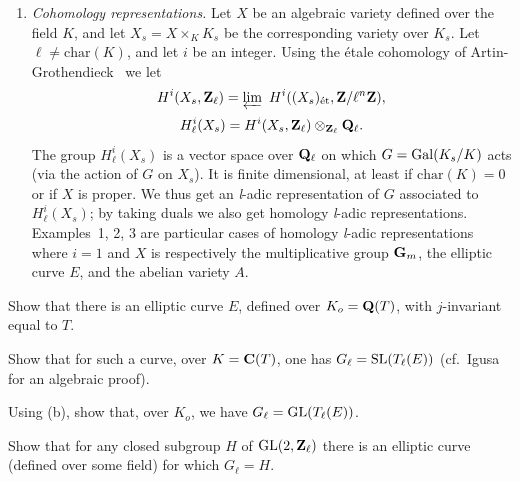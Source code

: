 \begin{enumerate}[label=\arabic*.,leftmargin=2.2em,itemsep=0.15ex,topsep=0.4ex]
\item \emph{Cohomology representations.}  Let $X$ be an algebraic
variety defined over the field $K$, and let $X_s = X \times_K K_s$ be
the corresponding variety over $K_s$.  Let $\ell \neq
\mathrm{char}(K)$, and let $i$ be an integer.  Using the étale
cohomology of Artin-Grothendieck~\cite{artin-grothendieck-sga} we let
\[
H^i(X_s, \Z_\ell) = \varprojlim\ H^i((X_s)_{\text{ét}}, \Z/\ell^n\Z),
\]
\[
H^i_\ell(X_s) = H^i(X_s, \mathbf{Z}_\ell) \mathbin{\otimes}_{\mathbf{Z}_\ell} \mathbf{Q}_\ell.
\]
The group $H^i_\ell(X_s)$ is a vector space over $\mathbf{Q}_\ell$ on which
$G = \mathrm{Gal}(K_s/K)$ acts (via the action of $G$ on $X_s$).  It is finite
dimensional, at least if $\mathrm{char}(K) = 0$ or if $X$ is proper.  We
thus get an \textit{l}-adic representation of $G$ associated to
$H^i_\ell(X_s)$; by taking duals we also get homology \textit{l}-adic
representations.  Examples~1, 2, 3 are particular cases of homology
\textit{l}-adic representations where $i = 1$ and $X$ is respectively
the multiplicative group $\mathbf{G}_m$, the elliptic curve $E$, and the abelian
variety $A$.
\end{enumerate}

\begin{alist}
\item Show that there is an elliptic curve $E$, defined over
$K_o = \mathbf{Q}(T)$, with $j$-invariant equal to $T$.
\item Show that for such a curve, over $K = \mathbf{C}(T)$, one has
$G_\ell = \mathrm{SL}(T_\ell(E))$ (cf.~Igusa~\cite{igusa} for an algebraic
proof).
\item Using (b), show that, over $K_o$, we have
$G_\ell = \mathrm{GL}(T_\ell(E))$.
\item Show that for any closed subgroup $H$ of $\mathrm{GL}(2, \mathbf{Z}_\ell)$ there
is an elliptic curve (defined over some field) for which $G_\ell = H$.
\end{alist}

